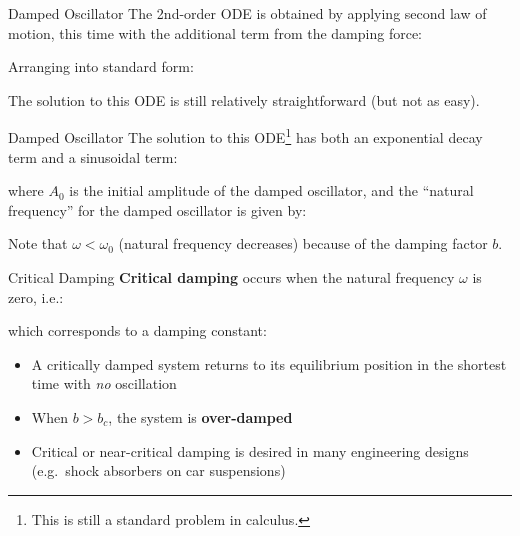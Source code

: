 \documentclass[12pt,compress,aspectratio=169]{beamer}
\begin{document}
\begin{frame}{Damped Oscillator}
  The 2nd-order ODE is obtained by applying second law of motion, this time
  with the additional term from the damping force:


  Arranging into standard form:
  

  The solution to this ODE is still relatively straightforward (but not as
  easy).
\end{frame}



\begin{frame}{Damped Oscillator}
  The solution to this ODE\footnote{This is still a standard problem in
    calculus.} has both an {\color{red}exponential decay term} and a
  {\color{blue}sinusoidal term}:


  \vspace{-.1in}where $A_0$ is the initial amplitude of the damped oscillator,
  and the ``natural frequency'' for the damped oscillator is given by:

  
  Note that $\omega<\omega_0$ (natural frequency decreases) because of the
  damping factor $b$.
  \vspace{.2in}
\end{frame}



\begin{frame}{Critical Damping}
  \textbf{Critical damping} occurs when the natural frequency $\omega$ is zero,
  i.e.:
  

  which corresponds to a damping constant:

  \begin{itemize}
  \item A critically damped system returns to its equilibrium
    position in the shortest time with \emph{no} oscillation
  \item When $b>b_c$, the system is \textbf{over-damped}
  \item Critical or near-critical damping is desired in many engineering designs
    (e.g.\ shock absorbers on car suspensions)
  \end{itemize}
\end{frame}
\end{document}
